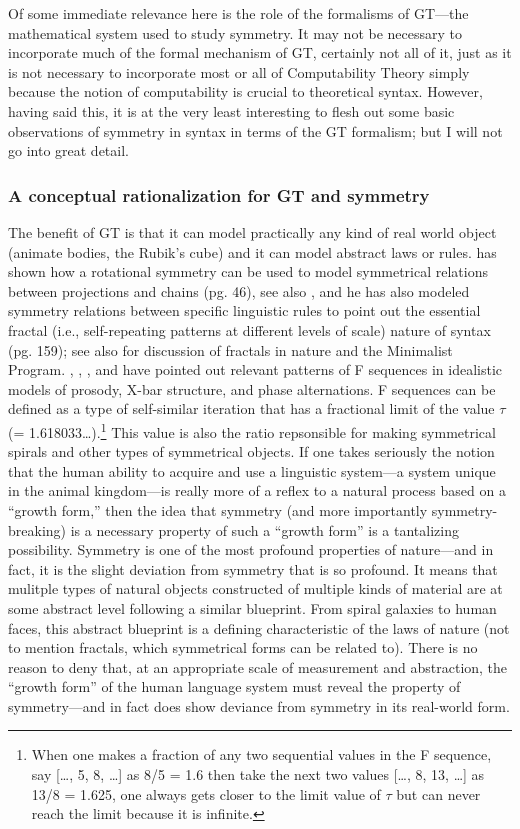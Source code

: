 \documentclass[11pt,twoside]{article}
\begin{document}
Of some immediate relevance here is the role of the formalisms of GT---the mathematical system used to study symmetry. It may not be necessary to incorporate much of the formal mechanism of GT, certainly not all of it, just as it is not necessary to incorporate most or all of Computability Theory simply because the notion of computability is crucial to theoretical syntax. However, having said this, it is at the very least interesting to flesh out some basic observations of symmetry in syntax in terms of the GT formalism; but I will not go into great detail.

\subsubsection{A conceptual rationalization for GT and symmetry} 
The benefit of GT is that it can model practically any kind of real world object (animate bodies, the Rubik's cube) and it can model abstract laws or rules. \cite{boeckx08bare} has shown how a rotational symmetry can be used to model symmetrical relations between projections and chains (pg. 46), see also \cite{uriagereka:1998}, and he has also modeled symmetry relations between specific linguistic rules to point out the essential fractal (i.e., self-repeating patterns at different levels of scale) nature of syntax (pg. 159); see also \cite{boeckxuri:2007} for discussion of fractals in nature and the Minimalist Program. \cite{medeiros:2008}, \cite{soschen:2008}, \cite{idsardi:2008}, and \cite{ppuriagereka:2008} have pointed out relevant patterns of F sequences in idealistic models of prosody, X-bar structure, and phase alternations. F sequences can be defined as a type of self-similar iteration that has a fractional limit of the value $\tau$ (= 1.618033\dots).\footnote{When one makes a fraction of any two sequential values in the F sequence, say [\dots, 5, 8, \dots] as 8/5 = 1.6 then take the next two values [\dots, 8, 13, \dots] as 13/8 = 1.625, one always gets closer to the limit value of $\tau$ but can never reach the limit because it is infinite.} This value is also the ratio repsonsible for making symmetrical spirals and other types of symmetrical objects.
If one takes seriously the notion that the human ability to acquire and use a linguistic system---a system unique in the animal kingdom---is really more of a reflex to a natural process based on a ``growth form,'' then the idea that symmetry (and more importantly symmetry-breaking) is a necessary property of such a ``growth form'' is a tantalizing possibility. Symmetry is one of the most profound properties of nature---and in fact, it is the slight deviation from symmetry that is so profound. It means that mulitple types of natural objects constructed of multiple kinds of material are at some abstract level following a similar blueprint. From spiral galaxies to human faces, this abstract blueprint is a defining characteristic of the laws of nature (not to mention fractals, which symmetrical forms can be related to). There is no reason to deny that, at an appropriate scale of measurement and abstraction, the ``growth form'' of the human language system must reveal the property of symmetry---and in fact does show deviance from symmetry in its real-world form.
\end{document}

